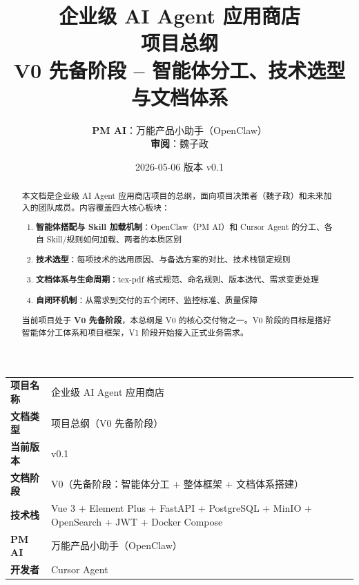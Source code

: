 \documentclass[11pt,a4paper]{article}
\title{
\vspace{-1em}
{\Huge\bfseries\color{primary} 企业级 AI Agent 应用商店}\\[0.8em]
{\Large\bfseries\color{accent} 项目总纲}\\[0.5em]
{\large V0 先备阶段 -- 智能体分工、技术选型与文档体系}
}
\author{
\textbf{PM AI}：万能产品小助手（OpenClaw）\\[0.3em]
\textbf{审阅}：魏子政
}
\date{2026-05-06 \quad 版本 v0.1}
\begin{document}
\maketitle
\thispagestyle{empty}

\vspace{1em}

\begin{center}
\begin{tabular}{>{\bfseries}p{3cm} p{10cm}}
\toprule
项目名称 & 企业级 AI Agent 应用商店 \\
文档类型 & 项目总纲（V0 先备阶段） \\
当前版本 & v0.1 \\
文档阶段 & V0（先备阶段：智能体分工 + 整体框架 + 文档体系搭建） \\
技术栈 & Vue 3 + Element Plus + FastAPI + PostgreSQL + MinIO + OpenSearch + JWT + Docker Compose \\
PM AI & 万能产品小助手（OpenClaw） \\
开发者 & Cursor Agent \\
\bottomrule
\end{tabular}
\end{center}

\vspace{1.5em}

\begin{abstract}
本文档是企业级 AI Agent 应用商店项目的总纲，面向项目决策者（魏子政）和未来加入的团队成员。内容覆盖四大核心板块：

\begin{enumerate}[nosep]
  \item \textbf{智能体搭配与 Skill 加载机制}：OpenClaw（PM AI）和 Cursor Agent 的分工、各自 Skill/规则如何加载、两者的本质区别
  \item \textbf{技术选型}：每项技术的选用原因、与备选方案的对比、技术栈锁定规则
  \item \textbf{文档体系与生命周期}：tex-pdf 格式规范、命名规则、版本迭代、需求变更处理
  \item \textbf{自闭环机制}：从需求到交付的五个闭环、监控标准、质量保障
\end{enumerate}

当前项目处于 \textbf{V0 先备阶段}，本总纲是 V0 的核心交付物之一。V0 阶段的目标是搭好智能体分工体系和项目框架，V1 阶段开始接入正式业务需求。
\end{abstract}

\newpage
\tableofcontents
\newpage

\end{document}
